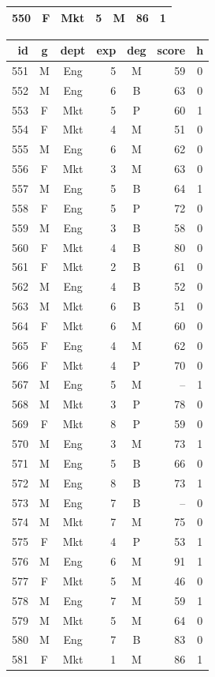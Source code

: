 \documentclass[11pt,a4paper]{article}
\begin{document}
\begin{center}
\begin{tabular}[t]{@{}r c c r c r c@{}}
550 & F & Mkt & 5 & M & 86 & 1 \\
\bottomrule
\end{tabular}
\hfill
\begin{tabular}[t]{@{}r c c r c r c@{}}
\toprule
id & g & dept & exp & deg & score & h \\
\midrule
551 & M & Eng & 5 & M & 59 & 0 \\
552 & M & Eng & 6 & B & 63 & 0 \\
553 & F & Mkt & 5 & P & 60 & 1 \\
554 & F & Mkt & 4 & M & 51 & 0 \\
555 & M & Eng & 6 & M & 62 & 0 \\
556 & F & Mkt & 3 & M & 63 & 0 \\
557 & M & Eng & 5 & B & 64 & 1 \\
558 & F & Eng & 5 & P & 72 & 0 \\
559 & M & Eng & 3 & B & 58 & 0 \\
560 & F & Mkt & 4 & B & 80 & 0 \\
561 & F & Mkt & 2 & B & 61 & 0 \\
562 & M & Eng & 4 & B & 52 & 0 \\
563 & M & Mkt & 6 & B & 51 & 0 \\
564 & F & Mkt & 6 & M & 60 & 0 \\
565 & F & Eng & 4 & M & 62 & 0 \\
566 & F & Mkt & 4 & P & 70 & 0 \\
567 & M & Eng & 5 & M & -- & 1 \\
568 & M & Mkt & 3 & P & 78 & 0 \\
569 & F & Mkt & 8 & P & 59 & 0 \\
570 & M & Eng & 3 & M & 73 & 1 \\
571 & M & Eng & 5 & B & 66 & 0 \\
572 & M & Eng & 8 & B & 73 & 1 \\
573 & M & Eng & 7 & B & -- & 0 \\
574 & M & Mkt & 7 & M & 75 & 0 \\
575 & F & Mkt & 4 & P & 53 & 1 \\
576 & M & Eng & 6 & M & 91 & 1 \\
577 & F & Mkt & 5 & M & 46 & 0 \\
578 & M & Eng & 7 & M & 59 & 1 \\
579 & M & Mkt & 5 & M & 64 & 0 \\
580 & M & Eng & 7 & B & 83 & 0 \\
581 & F & Mkt & 1 & M & 86 & 1 \\

\end{tabular}
\end{center}
\end{document}
